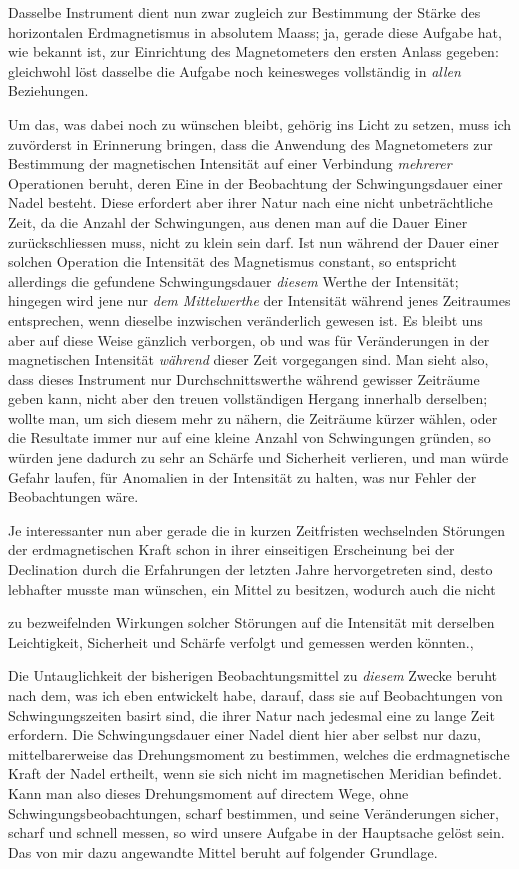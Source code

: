Dasselbe Instrument dient nun zwar zugleich zur Bestimmung der Stärke des horizontalen Erdmagnetismus in absolutem Maass; ja, gerade diese Aufgabe hat, wie bekannt ist, zur Einrichtung des Magnetometers den ersten Anlass gegeben: gleichwohl löst dasselbe die Aufgabe noch keinesweges vollständig in \textit{allen} Beziehungen.

Um das, was dabei noch zu wünschen bleibt, gehörig ins Licht zu setzen, muss ich zuvörderst in Erinnerung bringen, dass die Anwendung des Magnetometers zur Bestimmung der magnetischen Intensität auf einer Verbindung \textit{mehrerer} Operationen beruht, deren Eine in der Beobachtung der Schwingungsdauer einer Nadel besteht. Diese erfordert aber ihrer Natur nach eine nicht unbeträchtliche Zeit, da die Anzahl der Schwingungen, aus denen man auf die Dauer Einer zurückschliessen muss, nicht zu klein sein darf. Ist nun während der Dauer einer solchen Operation die Intensität des Magnetismus constant, so entspricht allerdings die gefundene Schwingungsdauer \textit{diesem} Werthe der Intensität; hingegen wird jene nur \textit{dem Mittelwerthe} der Intensität während jenes Zeitraumes entsprechen, wenn dieselbe inzwischen veränderlich gewesen ist. Es bleibt uns aber auf diese Weise gänzlich verborgen, ob und was für Veränderungen in der magnetischen Intensität \textit{während} dieser Zeit vorgegangen sind. Man sieht also, dass dieses Instrument nur Durchschnittswerthe während gewisser Zeiträume geben kann, nicht aber den treuen vollständigen Hergang innerhalb derselben; wollte man, um sich diesem mehr zu nähern, die Zeiträume kürzer wählen, oder die Resultate immer nur auf eine kleine Anzahl von Schwingungen gründen, so würden jene dadurch zu sehr an Schärfe und Sicherheit verlieren, und man würde Gefahr laufen, für Anomalien in der Intensität zu halten, was nur Fehler der Beobachtungen wäre.

Je interessanter nun aber gerade die in kurzen Zeitfristen wechselnden Störungen der erdmagnetischen Kraft schon in ihrer einseitigen Erscheinung bei der Declination durch die Erfahrungen der letzten Jahre hervorgetreten sind, desto lebhafter musste man wünschen, ein Mittel zu besitzen, wodurch auch die nicht
\par\clearpage
{}
\noindent zu bezweifelnden Wirkungen solcher Störungen auf die Intensität mit derselben Leichtigkeit, Sicherheit und Schärfe verfolgt und gemessen werden könnten.,

Die Untauglichkeit der bisherigen Beobachtungsmittel zu \textit{diesem} Zwecke beruht nach dem, was ich eben entwickelt habe, darauf, dass sie auf Beobachtungen von Schwingungszeiten basirt sind, die ihrer Natur nach jedesmal eine zu lange Zeit erfordern. Die Schwingungsdauer einer Nadel dient hier aber selbst nur dazu, mittelbarerweise das Drehungsmoment zu bestimmen, welches die erdmagnetische Kraft der Nadel ertheilt, wenn sie sich nicht im magnetischen Meridian befindet. Kann man also dieses Drehungsmoment auf directem Wege, ohne Schwingungsbeobachtungen, scharf bestimmen, und seine Veränderungen sicher, scharf und schnell messen, so wird unsere Aufgabe in der Hauptsache gelöst sein. Das von mir dazu angewandte Mittel beruht auf folgender Grundlage.

